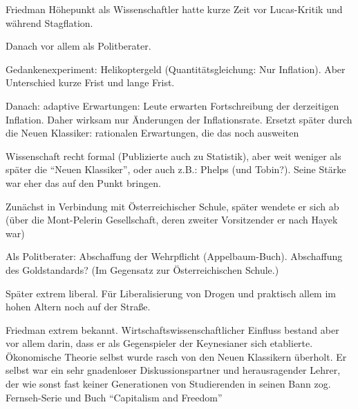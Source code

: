 Friedman  Höhepunkt als Wissenschaftler hatte kurze Zeit vor Lucas-Kritik und während Stagflation. 



Danach vor allem als Politberater.



Gedankenexperiment: Helikoptergeld (Quantitätsgleichung: Nur Inflation). Aber Unterschied kurze Frist und lange Frist.

Danach: adaptive Erwartungen: Leute erwarten Fortschreibung der derzeitigen Inflation. Daher wirksam nur Änderungen der Inflationsrate. Ersetzt später durch die Neuen Klassiker: rationalen Erwartungen, die das noch ausweiten


Wissenschaft recht formal (Publizierte auch zu Statistik), aber weit weniger als später die "`Neuen Klassiker"', oder auch z.B.: Phelps (und Tobin?). Seine Stärke war eher das auf den Punkt bringen.




Zunächst in Verbindung mit Österreichischer Schule, später wendete er sich ab (über die Mont-Pelerin Gesellschaft, deren zweiter Vorsitzender er nach Hayek war)


Als Politberater: Abschaffung der Wehrpflicht (Appelbaum-Buch). Abschaffung des Goldstandards? (Im Gegensatz zur Österreichischen Schule.)




Später extrem liberal. Für Liberalisierung von Drogen und praktisch allem im hohen Altern noch auf der Straße.

Friedman extrem bekannt. Wirtschaftswissenschaftlicher Einfluss bestand aber vor allem darin, dass er als Gegenspieler der Keynesianer sich etablierte. Ökonomische Theorie selbst wurde rasch von den Neuen Klassikern überholt. Er selbst war ein sehr gnadenloser Diskussionspartner und herausragender Lehrer, der wie sonst fast keiner Generationen von Studierenden in seinen Bann zog. 
Fernseh-Serie und Buch "`Capitalism and Freedom"'















